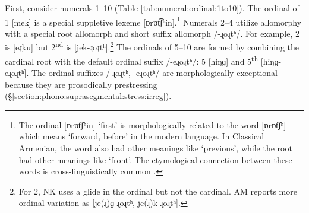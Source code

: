 	First, consider numerals 1–10 (Table \ref{tab:numeral:ordinal:1to10}). The ordinal of 1 [mek] is a special suppletive lexeme [ɒrɒt͡ʃʰin].{\footnote{The ordinal [{ɒrɒt͡ʃʰin}] `first' is morphologically related to the word [{ɒrɒt͡ʃʰ}] which means `forward, before' in the modern language. In Classical Armenian, the word also had other meanings like `previous', while the root had other meanings like `front'. The etymological connection between these words is cross-linguistically common \citep[441]{veselinova-1997-suppletionDerivationOrdinalNumeral}.}}  	Numerals 2--4 utilize allomorphy with a special root allomorph and short suffix allomorph /-ɻoɻtʰ/. For example, 2 is [eɻku] but 2\textsuperscript{nd} is [jek-ɻoɻtʰ].{\footnote{For 2, NK  uses a glide in the ordinal but not the cardinal. AM reports more ordinal variation as [je(ɻ)ɡ-ɻoɻtʰ, je(ɻ)k-ɻoɻtʰ].}}
 The ordinals of 5--10 are formed by combining the cardinal root with the default ordinal suffix /-eɻoɻtʰ/: 5 [hiŋɡ] and 5\textsuperscript{th} [hiŋɡ-eɻoɻtʰ]. The ordinal suffixes /-ɻoɻtʰ, -eɻoɻtʰ/ are morphologically exceptional because they are prosodically prestressing (\S\ref{section:phono:suprasegmental:stress:irreg}).\largerpage
	
